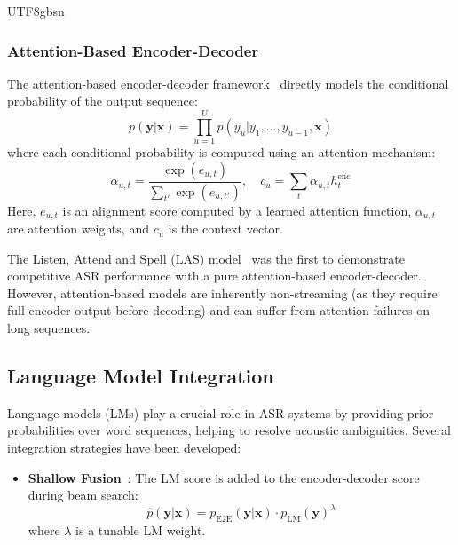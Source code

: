 \documentclass[12pt,a4paper]{article}
\begin{document}
\begin{CJK}{UTF8}{gbsn}
\subsubsection{Attention-Based Encoder-Decoder}

The attention-based encoder-decoder framework~\cite{bahdanau2015neural,chan2016listen} directly models the conditional probability of the output sequence:
\begin{equation}
    p(\mathbf{y} | \mathbf{x}) = \prod_{u=1}^{U} p(y_u | y_1, \ldots, y_{u-1}, \mathbf{x})
\end{equation}
where each conditional probability is computed using an attention mechanism:
\begin{equation}
    \alpha_{u,t} = \frac{\exp(e_{u,t})}{\sum_{t'} \exp(e_{u,t'})}, \quad c_u = \sum_t \alpha_{u,t} h_t^{\text{enc}}
\end{equation}
Here, $e_{u,t}$ is an alignment score computed by a learned attention function, $\alpha_{u,t}$ are attention weights, and $c_u$ is the context vector.

The Listen, Attend and Spell (LAS) model~\cite{chan2016listen} was the first to demonstrate competitive ASR performance with a pure attention-based encoder-decoder. However, attention-based models are inherently non-streaming (as they require full encoder output before decoding) and can suffer from attention failures on long sequences.

\subsection{Language Model Integration}
\label{subsec:lm}

Language models (LMs) play a crucial role in ASR systems by providing prior probabilities over word sequences, helping to resolve acoustic ambiguities. Several integration strategies have been developed:

\begin{itemize}[leftmargin=*]
    \item \textbf{Shallow Fusion}~\cite{gulcehre2015using}: The LM score is added to the encoder-decoder score during beam search:
    \begin{equation}
        \hat{p}(\mathbf{y} | \mathbf{x}) = p_{\text{E2E}}(\mathbf{y} | \mathbf{x}) \cdot p_{\text{LM}}(\mathbf{y})^{\lambda}
    \end{equation}
    where $\lambda$ is a tunable LM weight.


\end{itemize}
\end{CJK}
\end{document}
